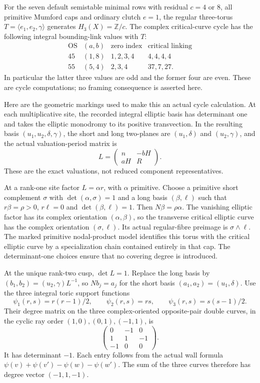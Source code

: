 For the seven default semistable minimal rows with residual
$c=4$ or $8$, all primitive Mumford caps and ordinary clutch
$e=1$, the regular three-torus
$T=\langle e_1,e_2,\gamma\rangle$ generates
$H_3(X)=\mathbb Z/c$. The complex critical-curve cycle
has the following integral bounding-link values with $T$:
\[
 \begin{array}{c|c|c|c}
 \text{OS}&(a,b)&\text{zero index}&\text{critical linking}\\ \hline
 45&(1,8)&1,2,3,4&4,4,4,4\\
 55&(5,4)&2,3,4&37,7,27 .
 \end{array}
\]
In particular the latter three values are odd and the
former four are even. These are cycle computations;
no framing consequence is asserted here.

Here are the geometric markings used to make this an
actual cycle calculation. At each multiplicative site,
the recorded integral elliptic basis has determinant
one and takes the elliptic monodromy to its positive
transvection. In the resulting basis
$(u_1,u_2,\delta,\gamma)$, the short and long two-planes
are $(u_1,\delta)$ and $(u_2,\gamma)$, and the actual
valuation-period matrix is
\[
                    L=\begin{pmatrix}n&-bH\\aH&R\end{pmatrix}.
\]
These are the exact valuations, not reduced component
representatives.

At a rank-one site factor $L=\alpha r$, with $\alpha$
primitive. Choose a primitive short complement $\sigma$
with $\det(\alpha,\sigma)=1$ and a long basis
$(\beta,\ell)$ such that $r\beta=\rho>0$,
$r\ell=0$ and $\det(\beta,\ell)=1$.
Then $N\beta=\rho\alpha$. The vanishing elliptic
factor has its complex orientation $(\alpha,\beta)$,
so the transverse critical elliptic curve has
the complex orientation $(\sigma,\ell)$.
Its actual regular-fibre preimage is
$\sigma\wedge\ell$.
The marked primitive nodal-product model identifies
this torus with the critical elliptic curve by a
specialization chain contained entirely in that cap.
The determinant-one choices ensure that no covering
degree is introduced.

At the unique rank-two cusp, $\det L=1$.
Replace the long basis by
$(b_1,b_2)=(u_2,\gamma)L^{-1}$, so $Nb_j=a_j$ for
the short basis $(a_1,a_2)=(u_1,\delta)$.
Use the three integral toric support functions
\[
 \psi_1(r,s)=r(r-1)/2,\qquad
 \psi_2(r,s)=rs,\qquad
 \psi_3(r,s)=s(s-1)/2.
\]
Their degree matrix on the three complex-oriented
opposite-pair double curves, in the cyclic ray order
$(1,0),(0,1),(-1,1)$, is
\[
                     \begin{pmatrix}
                       0&-1&0\\1&1&-1\\-1&0&0
                     \end{pmatrix}.
\]
It has determinant $-1$.
Each entry follows from the actual wall formula
$\psi(v)+\psi(v')-\psi(w)-\psi(w')$.
The sum of the three curves therefore has degree
vector $(-1,1,-1)$.

